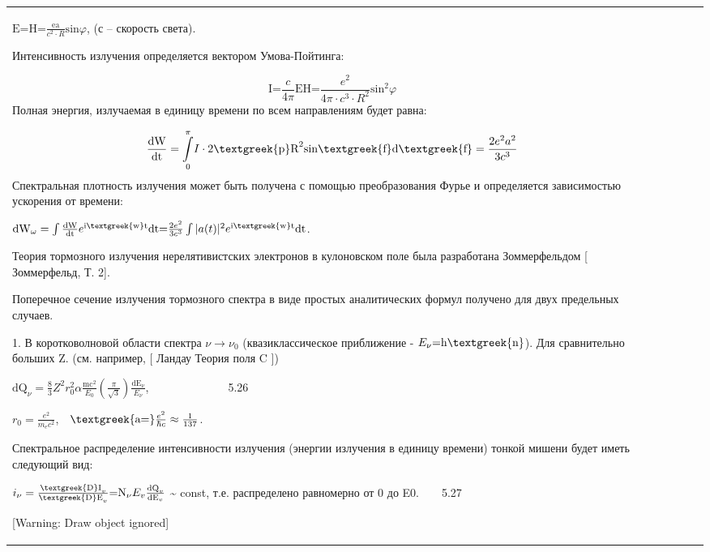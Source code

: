 \documentclass[a4paper,14pt, openany, twoside, draft]{extbook} %
\begin{document}
\begin{flushleft}
\begin{supertabular}{|m{1.7279999cm}|m{1.522cm}|m{1.522cm}|m{1.522cm}|m{1.744cm}|}
 ${\text{E=H=}}\frac{{\text{ea}}}{c^2\cdot R}\text{sin}\varphi $,  (с – скорость света).

Интенсивность излучения определяется вектором Умова-Пойтинга:

\begin{equation*}
{\text{I=}}\frac c{4\pi }{\text{EH=}}\frac{e^2}{4\pi \cdot c^3\cdot R^2}\text{sin}^2\varphi
\end{equation*}
Полная энергия, излучаемая в единицу времени по всем направлениям будет равна:

\begin{equation*}
\frac{{\text{dW}}}{{\text{dt}}}=\overset{\pi }{\underset 0{\int }}I\cdot 2{\text{\textgreek{p}R}}^2\text{sin}{\text{\textgreek{f}d\textgreek{f}}}=\frac{2e^2a^2}{3c^3}
\end{equation*}
Спектральная плотность излучения может быть получена с помощью преобразования Фурье и определяется зависимостью ускорения от времени:

 ${\text{dW}}_{\omega }=\int \frac{{\text{dW}}}{{\text{dt}}}e^{{\text{i\textgreek{w}t}}}{\text{dt=}}\frac{2e^2}{3c^3}\int |a(t)|^2e^{{\text{i\textgreek{w}t}}}{\text{dt}}$.

Теория тормозного излучения нерелятивистских электронов в кулоновском поле была разработана Зоммерфельдом [ Зоммерфельд, Т. 2].

Поперечное сечение излучения тормозного спектра в виде простых аналитических формул получено для двух предельных случаев.

1. В коротковолновой области спектра  $\nu \rightarrow \nu _0$ (квазиклассическое приближение -  $E_{\nu }{\text{=h\textgreek{n}}}$). Для сравнительно больших Z. (см. например, [ Ландау Теория поля C ])

 ${\text{dQ}}_{\nu }=\frac 8 3Z^2r_0^2\alpha \frac{{\text{mc}}^2}{E_0}(\frac{\pi }{\sqrt 3})\frac{{\text{dE}}_{\nu }}{E_{\nu }}$,\ \ \ \ \ \ \ \ \ \ \ \ \ \ 5.26

 $r_0=\frac{e^2}{m_ec^2}$,\ \  ${\text{\textgreek{a=}}}\frac{e^2}{\hbar c}\approx \frac 1{137}$.

Спектральное распределение интенсивности излучения (энергии излучения в единицу времени) тонкой мишени будет иметь следующий вид:

 $i_{\nu }=\frac{{\text{\textgreek{D}I}}_v}{{\text{\textgreek{D}E}}_v}{\text{=N}}_{\nu }E_v\frac{{\text{dQ}}_v}{{\text{dE}}_v}$  \~{} const, т.е. распределено равномерно от 0 до E0.\ \ \ \ 5.27

[Warning: Draw object ignored]


\end{supertabular}
\end{flushleft}
\end{document}
